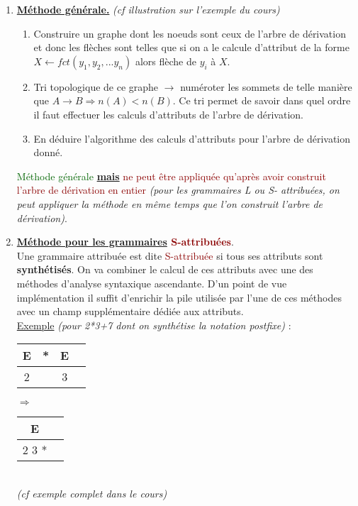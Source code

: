 \documentclass{article}
\newcommand{\gre}[1]{\textcolor{darkgreen}{#1}}
\newcommand{\red}[1]{\textcolor{darkred}{#1}}
\begin{document}
\begin{enumerate}
\item \textbf{\underline{Méthode générale.}} \textit{(cf illustration sur l'exemple du cours)}
	\begin{enumerate}
		\item Construire un graphe dont les noeuds sont ceux de l'arbre de dérivation et donc les flèches sont telles que si on a le calcule d'attribut de la forme $X\leftarrow 
		fct(y_1,y_2,...y_n)$ alors flèche de $y_i$ à $X$.
		\item Tri topologique de ce graphe $\rightarrow$ numéroter les sommets de telle manière que $A\rightarrow B \Rightarrow n(A) < n(B)$. Ce tri permet de savoir dans quel 
		ordre il faut effectuer les calculs d'attributs de l'arbre de dérivation.
		\item En déduire l'algorithme des calculs d'attributs pour l'arbre de dérivation donné.
	\end{enumerate}
	\gre{Méthode générale} \underline{\textbf{mais}} \red{ne peut être appliquée qu'après avoir construit l'arbre de dérivation en entier} \textit{(pour les grammaires L ou S-
	attribuées, on peut appliquer la méthode en même temps que l'on construit l'arbre de dérivation)}.\\
	
\item \textbf{\underline{Méthode pour les grammaires} \red{S-attribuées}}. \\
Une grammaire attribuée est dite \red{S-attribuée} si tous ses attributs sont \textbf{synthétisés}. On va combiner le calcul de ces attributs avec une des méthodes d'analyse 
syntaxique ascendante. D'un point de vue implémentation il suffit d'enrichir la pile utilisée par l'une de ces méthodes avec un champ supplémentaire dédiée aux attributs. \\
\underline{Exemple} \textit{(pour 2*3+7 dont on synthétise la notation postfixe)} : \begin{tabular}{|c|c|c|c|}\hline E & * & E &  \\ \hline 2 & & 3 & \\ \hline \end{tabular} 
$\Rightarrow$ \begin{tabular}{|c|c|}\hline E &  \\ \hline 2 3 * & \\ \hline \end{tabular} \\ \textit{(cf exemple complet dans le cours)}\\


\end{enumerate}
\end{document}
